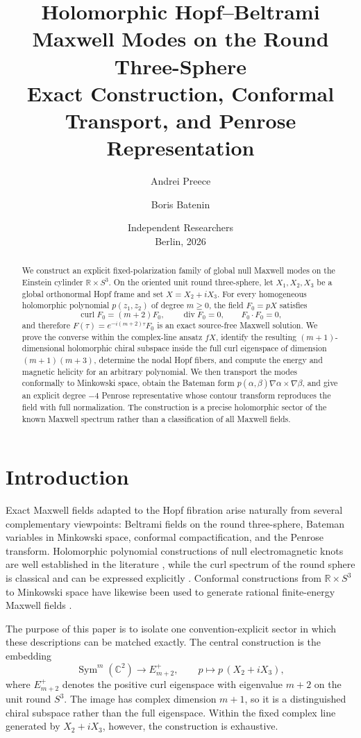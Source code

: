 \documentclass[11pt,a4paper]{article}
\title{\textbf{Holomorphic Hopf--Beltrami Maxwell Modes on the Round Three-Sphere}\\[0.35em]
\large Exact Construction, Conformal Transport, and Penrose Representation}
\author{Andrei Preece \and Boris Batenin}
\date{\small Independent Researchers\\Berlin, 2026}
\numberwithin{equation}{section}
\theoremstyle{remark}
\newcommand{\curl}{\operatorname{curl}}
\newcommand{\divg}{\operatorname{div}}
\newcommand{\RR}{\mathbb{R}}
\newcommand{\CC}{\mathbb{C}}
\begin{document}
\maketitle

\begin{abstract}
We construct an explicit fixed-polarization family of global null Maxwell modes on the Einstein cylinder \(\RR\times S^3\). On the oriented unit round three-sphere, let \(X_1,X_2,X_3\) be a global orthonormal Hopf frame and set \(X=X_2+iX_3\). For every homogeneous holomorphic polynomial \(p(z_1,z_2)\) of degree \(m\ge0\), the field \(F_0=pX\) satisfies
\[
\curl F_0=(m+2)F_0,\qquad \divg F_0=0,\qquad F_0\cdot F_0=0,
\]
and therefore \(F(\tau)=e^{-i(m+2)\tau}F_0\) is an exact source-free Maxwell solution. We prove the converse within the complex-line ansatz \(fX\), identify the resulting \((m+1)\)-dimensional holomorphic chiral subspace inside the full curl eigenspace of dimension \((m+1)(m+3)\), determine the nodal Hopf fibers, and compute the energy and magnetic helicity for an arbitrary polynomial. We then transport the modes conformally to Minkowski space, obtain the Bateman form \(p(\alpha,\beta)\nabla\alpha\times\nabla\beta\), and give an explicit degree \(-4\) Penrose representative whose contour transform reproduces the field with full normalization. The construction is a precise holomorphic sector of the known Maxwell spectrum rather than a classification of all Maxwell fields.
\end{abstract}

\section{Introduction}

Exact Maxwell fields adapted to the Hopf fibration arise naturally from several complementary viewpoints: Beltrami fields on the round three-sphere, Bateman variables in Minkowski space, conformal compactification, and the Penrose transform. Holomorphic polynomial constructions of null electromagnetic knots are well established in the literature \cite{Kedia2013,Thompson2015}, while the curl spectrum of the round sphere is classical and can be expressed explicitly \cite{Baer2019}. Conformal constructions from \(\RR\times S^3\) to Minkowski space have likewise been used to generate rational finite-energy Maxwell fields \cite{Lechtenfeld2018}.

The purpose of this paper is to isolate one convention-explicit sector in which these descriptions can be matched exactly. The central construction is the embedding
\[
\operatorname{Sym}^m(\CC^2)\longrightarrow E^+_{m+2},
\qquad
p\longmapsto p\,(X_2+iX_3),
\]
where \(E^+_{m+2}\) denotes the positive curl eigenspace with eigenvalue \(m+2\) on the unit round \(S^3\). The image has complex dimension \(m+1\), so it is a distinguished chiral subspace rather than the full eigenspace. Within the fixed complex line generated by \(X_2+iX_3\), however, the construction is exhaustive.
\end{document}
